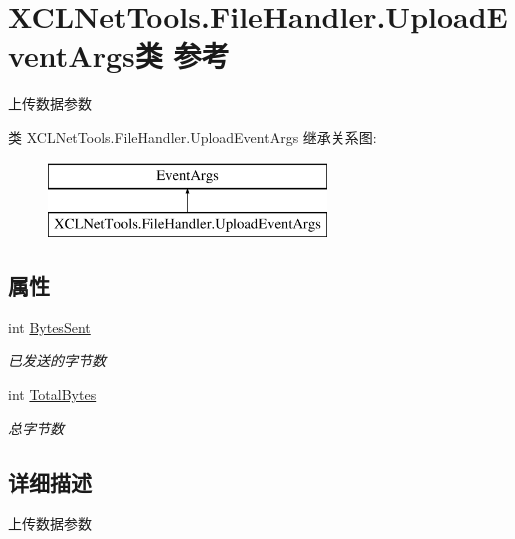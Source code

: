 \hypertarget{class_x_c_l_net_tools_1_1_file_handler_1_1_upload_event_args}{\section{X\-C\-L\-Net\-Tools.\-File\-Handler.\-Upload\-Event\-Args类 参考}
\label{class_x_c_l_net_tools_1_1_file_handler_1_1_upload_event_args}
}


上传数据参数  


类 X\-C\-L\-Net\-Tools.\-File\-Handler.\-Upload\-Event\-Args 继承关系图\-:\begin{figure}[H]
\begin{center}
\leavevmode
\includegraphics[height=2.000000cm]{class_x_c_l_net_tools_1_1_file_handler_1_1_upload_event_args}
\end{center}
\end{figure}
\subsection*{属性}
\begin{DoxyCompactItemize}
\item 
int \hyperlink{class_x_c_l_net_tools_1_1_file_handler_1_1_upload_event_args_aeb753c87413d86d610121060635794e1}{Bytes\-Sent}
\begin{DoxyCompactList}\small\item\em 已发送的字节数 \end{DoxyCompactList}\item 
int \hyperlink{class_x_c_l_net_tools_1_1_file_handler_1_1_upload_event_args_a874a8bc16016a3d11eb9aa52f9670eb4}{Total\-Bytes}
\begin{DoxyCompactList}\small\item\em 总字节数 \end{DoxyCompactList}\end{DoxyCompactItemize}


\subsection{详细描述}
上传数据参数 



